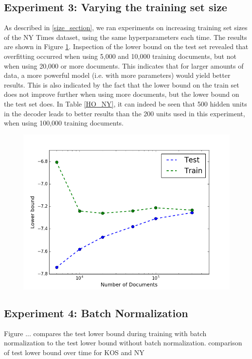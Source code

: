 \documentclass{report}
\begin{document}
	\subsection{Experiment 3: Varying the training set size}
	As described in \ref{size_section}, we ran experiments on increasing training set sizes of the NY Times dataset, using the same hyperparameters each time. The results are shown in Figure \ref{increase}. Inspection of the lower bound on the test set revealed that overfitting occurred when using 5,000 and 10,000 training documents, but not when using 20,000 or more documents. This indicates that for larger amounts of data, a more powerful model (i.e. with more parameters) would yield better results. This is also indicated by the fact that the lower bound on the train set does not improve further when using more documents, but the lower bound on the test set does. In Table \ref{HO_NY}, it can indeed be seen that 500 hidden units in the decoder  leads to better results than the 200 units used in this experiment, when using 100,000 training documents.
	
	
	\begin{figure}\label{increase}
		\includegraphics[scale=0.6]{img/increase.png}
	\end{figure}

	\subsection{Experiment 4: Batch Normalization}
	Figure ... compares the test lower bound during training with batch normalization to the test lower bound without batch normalization. comparison of test lower bound over time for KOS and NY
	
\end{document}
